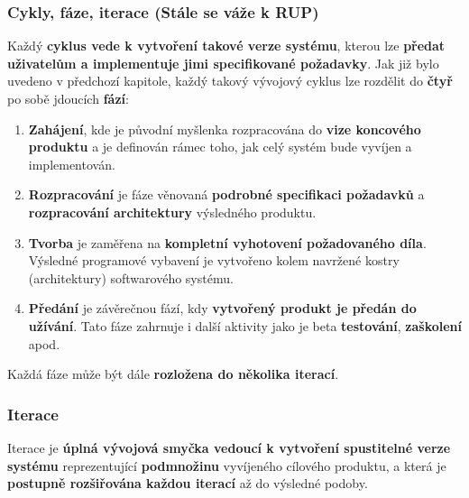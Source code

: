 \subsubsection{Cykly, fáze, iterace (Stále se váže k RUP)}
Každý \textbf{cyklus vede k vytvoření takové verze systému}, kterou lze \textbf{předat uživatelům a implementuje jimi specifikované požadavky}. Jak již bylo uvedeno v předchozí kapitole, každý takový vývojový cyklus lze rozdělit do \textbf{čtyř} po sobě jdoucích \textbf{fází}: 
\begin{enumerate}
\item \textbf{Zahájení}, kde je původní myšlenka rozpracována do \textbf{vize koncového produktu} a je definován rámec toho, jak celý systém bude vyvíjen a implementován. 
\item \textbf{Rozpracování} je fáze věnovaná \textbf{podrobné specifikaci požadavků} a \textbf{rozpracování architektury} výsledného produktu. 
\item \textbf{Tvorba} je zaměřena na \textbf{kompletní vyhotovení požadovaného díla}.  Výsledné  programové vybavení je vytvořeno kolem navržené kostry (architektury) softwarového systému. 
\item \textbf{Předání} je závěrečnou fází, kdy \textbf{vytvořený produkt je předán do užívání}. Tato fáze zahrnuje i další aktivity jako je beta \textbf{testování}, \textbf{zaškolení} apod. 
\end{enumerate}
Každá fáze může být dále \textbf{rozložena do několika iterací}.

\subsubsection{Iterace}
Iterace je \textbf{úplná vývojová smyčka vedoucí k vytvoření spustitelné verze systému} reprezentující \textbf{podmnožinu} vyvíjeného cílového produktu, a která je \textbf{postupně rozšiřována každou iterací} až do výsledné podoby. 
\\\\
\noindent{}
